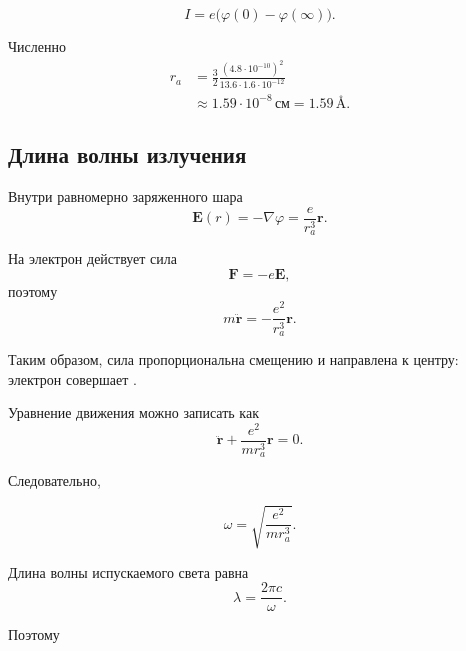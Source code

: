 \documentclass[../final.tex]{subfiles}
\begin{document}
\begin{equation*}
    I
    =
    e\bigl(
        \varphi(0)-\varphi(\infty)
    \bigr).
\end{equation*}

Численно
%
\begin{align*}
    r_a
    &=
    \frac{3}{2}
    \frac{(4.8\cdot10^{-10})^2}
         {13.6\cdot1.6\cdot10^{-12}}
    \\[3pt]
    &\approx
    1.59\cdot10^{-8}\,\text{см}
    =
    1.59\,\text{\AA}.
\end{align*}



\subsection*{Длина волны излучения}

Внутри равномерно заряженного шара
%
\begin{equation*}
    \mathbf E(r)
    =
    -\nabla\varphi
    =
    \frac{e}{r_a^3}\mathbf r.
\end{equation*}

На электрон действует сила
%
\begin{equation*}
    \mathbf F
    =
    -e\mathbf E,
\end{equation*}
%
поэтому
%
\begin{equation*}
    m\ddot{\mathbf r}
    =
    -\frac{e^2}{r_a^3}\mathbf r.
\end{equation*}

Таким образом, сила пропорциональна смещению и направлена к центру:
электрон совершает .

Уравнение движения можно записать как
%
\begin{equation*}
    \ddot{\mathbf r}
    +
    \frac{e^2}{mr_a^3}\mathbf r
    =
    0.
\end{equation*}

Следовательно,


\[
    \omega
    =
    \sqrt{
        \frac{e^2}{mr_a^3}
    }.
\]


Длина волны испускаемого света равна
%
\begin{equation*}
    \lambda
    =
    \frac{2\pi c}{\omega}.
\end{equation*}

Поэтому
\end{document}
